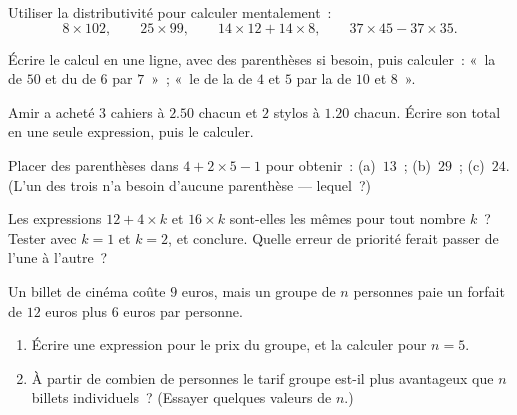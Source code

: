 \begin{exercise}[$\star$]\label{exo:g7:priorities:5}
Utiliser la distributivité pour calculer mentalement~:
\[
8 \times 102, \qquad
25 \times 99, \qquad
14 \times 12 + 14 \times 8, \qquad
37 \times 45 - 37 \times 35 .
\]
\end{exercise}

\begin{exercise}[$\star$]\label{exo:g7:priorities:6}
Écrire le calcul en une ligne, avec des parenthèses si besoin, puis
calculer~: «~la  de $50$ et du  de $6$ par $7$~»~;
«~le  de la  de $4$ et $5$ par la  de $10$ et
$8$~».
\end{exercise}

\begin{exercise}[$\star$]\label{exo:g7:priorities:7}
Amir a acheté $3$ cahiers à $2.50$ chacun et $2$ stylos à $1.20$
chacun. Écrire son total en une seule expression, puis le calculer.
\end{exercise}

\begin{exercise}[$\star\star$]\label{exo:g7:priorities:8}
Placer des parenthèses dans $4 + 2 \times 5 - 1$ pour obtenir~:
(a)~$13$~; (b)~$29$~; (c)~$24$. (L'un des trois n'a besoin d'aucune
parenthèse --- lequel~?)
\end{exercise}

\begin{exercise}[$\star\star$]\label{exo:g7:priorities:9}
Les expressions $12 + 4 \times k$ et $16 \times k$ sont-elles les
mêmes pour tout nombre $k$~? Tester avec $k = 1$ et $k = 2$, et
conclure. Quelle erreur de priorité ferait passer de l'une à
l'autre~?
\end{exercise}

\begin{exercise}[$\star\star$]\label{exo:g7:priorities:10}
Un billet de cinéma coûte $9$ euros, mais un groupe de $n$ personnes
paie un forfait de $12$ euros plus $6$ euros par personne.
\begin{enumerate}
  \item Écrire une expression pour le prix du groupe, et la calculer
        pour $n = 5$.
  \item À partir de combien de personnes le tarif groupe est-il plus
        avantageux que $n$ billets individuels~? (Essayer quelques
        valeurs de $n$.)
\end{enumerate}
\end{exercise}

